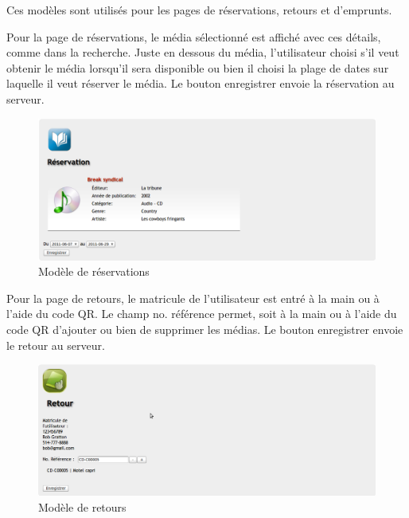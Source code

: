 \documentclass[letter, 11pt]{report}
\begin{document}
Ces modèles sont utilisés pour les pages de réservations, retours et d'emprunts. 

Pour la page de réservations, le média sélectionné est affiché avec ces détails, comme dans la recherche. Juste en dessous du média, l'utilisateur choisi s'il veut obtenir le média lorsqu'il sera disponible ou bien il choisi la plage de dates sur laquelle il veut réserver le média. Le bouton enregistrer envoie la réservation au serveur.

\begin{figure}[htbp]
	\begin{center}
		\includegraphics[scale=0.25]{captures_ecran/reservation.png}
	\end{center}
	\caption{Modèle de réservations}
\end{figure}

Pour la page de retours, le matricule de l'utilisateur est entré à la main ou à l'aide du code QR. Le champ no. référence permet, soit à la main ou à l'aide du code QR d'ajouter ou bien de supprimer les médias. Le bouton enregistrer envoie le retour au serveur.

\begin{figure}[htbp]
	\begin{center}
		\includegraphics[scale=0.25]{captures_ecran/retour.png}
	\end{center}
	\caption{Modèle de retours}
\end{figure}
\end{document}
